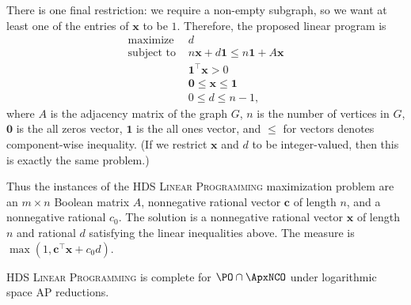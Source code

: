 There is one final restriction: we require a non-empty subgraph, so we want at least one of the entries of $\mathbf{x}$ to be $1$.
Therefore, the proposed linear program is
\begin{align*}
  \text{maximize } & d \\
  \text{subject to }
  & n \mathbf{x} + d \mathbf{1} \leq n \mathbf{1} + A \mathbf{x} \\
  & \mathbf{1}^\intercal \mathbf{x} > 0 \\
  & \mathbf{0} \leq \mathbf{x} \leq \mathbf{1} \\
  & 0 \leq d \leq n - 1,
\end{align*}
where $A$ is the adjacency matrix of the graph $G$, $n$ is the number of vertices in $G$, $\mathbf{0}$ is the all zeros vector, $\mathbf{1}$ is the all ones vector, and $\leq$ for vectors denotes component-wise inequality.
(If we restrict $\mathbf{x}$ and $d$ to be integer-valued, then this is exactly the same problem.)

Thus the instances of the \textsc{HDS Linear Programming} maximization problem are an $m \times n$ Boolean matrix $A$, nonnegative rational vector $\mathbf{c}$ of length $n$, and a nonnegative rational $c_0$.
The solution is a nonnegative rational vector $\mathbf{x}$ of length $n$ and rational $d$ satisfying the linear inequalities above.
The measure is $\max(1, \mathbf{c}^\intercal \mathbf{x} + c_0 d)$.

\begin{conjecture}
  \textsc{HDS Linear Programming} is complete for $\PO \cap \ApxNCO$ under logarithmic space AP reductions.
\end{conjecture}




